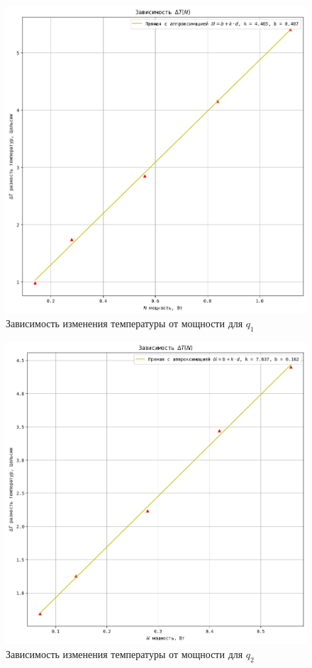\documentclass[a4paper, 12pt]{article}
\begin{document}
\begin{figure}[!ht]
    \begin{center}
        \includegraphics[scale=0.7]{graphic1.png}
    \caption{Зависимость изменения температуры от мощности для $q_1$}
    \end{center}
\end{figure}

\begin{figure}[!ht]
    \begin{center}
        \includegraphics[scale=0.7]{graphic2.png}
    \caption{Зависимость изменения температуры от мощности для $q_2$}
    \end{center}
\end{figure}
\end{document}
